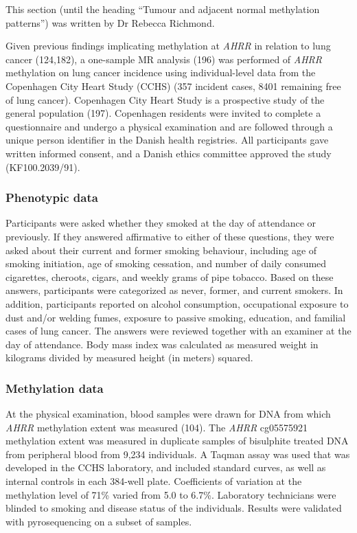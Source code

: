 \documentclass[11pt,oneside]{bristolthesis}
\begin{document}
This section (until the heading ``Tumour and adjacent normal methylation patterns'') was written by Dr Rebecca Richmond.

Given previous findings implicating methylation at \emph{AHRR} in relation to lung cancer (124,182), a one-sample MR analysis (196) was performed of \emph{AHRR} methylation on lung cancer incidence using individual-level data from the Copenhagen City Heart Study (CCHS) (357 incident cases, 8401 remaining free of lung cancer). Copenhagen City Heart Study is a prospective study of the general population (197). Copenhagen residents were invited to complete a questionnaire and undergo a physical examination and are followed through a unique person identifier in the Danish health registries. All participants gave written informed consent, and a Danish ethics committee approved the study (KF100.2039/91).

\hypertarget{phenotypic-data}{%
\subsubsection{Phenotypic data}\label{phenotypic-data}}

Participants were asked whether they smoked at the day of attendance or previously. If they answered affirmative to either of these questions, they were asked about their current and former smoking behaviour, including age of smoking initiation, age of smoking cessation, and number of daily consumed cigarettes, cheroots, cigars, and weekly grams of pipe tobacco. Based on these answers, participants were categorized as never, former, and current smokers. In addition, participants reported on alcohol consumption, occupational exposure to dust and/or welding fumes, exposure to passive smoking, education, and familial cases of lung cancer. The answers were reviewed together with an examiner at the day of attendance. Body mass index was calculated as measured weight in kilograms divided by measured height (in meters) squared.

\hypertarget{methylation-data}{%
\subsubsection{Methylation data}\label{methylation-data}}

At the physical examination, blood samples were drawn for DNA from which \emph{AHRR} methylation extent was measured (104). The \emph{AHRR} cg05575921 methylation extent was measured in duplicate samples of bisulphite treated DNA from peripheral blood from 9,234 individuals. A Taqman assay was used that was developed in the CCHS laboratory, and included standard curves, as well as internal controls in each 384-well plate. Coefficients of variation at the methylation level of 71\% varied from 5.0 to 6.7\%. Laboratory technicians were blinded to smoking and disease status of the individuals. Results were validated with pyrosequencing on a subset of samples.
\end{document}
